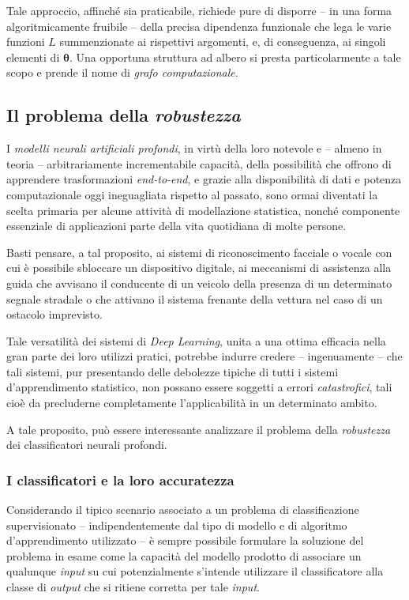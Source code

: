 \documentclass[a4paper, twoside]{article}
\begin{document}
Tale approccio, affinché sia praticabile, richiede pure di disporre -- in una forma algoritmicamente fruibile -- della precisa dipendenza funzionale che lega le varie funzioni $L$ summenzionate ai rispettivi argomenti, e, di conseguenza, ai singoli elementi di $\boldsymbol{\theta}$. Una opportuna struttura ad albero si presta particolarmente a tale scopo e prende il nome di \textit{grafo computazionale}.


\subsection{Il problema della \textit{robustezza}}

I \textit{modelli neurali artificiali profondi}, in virtù della loro notevole e -- almeno in teoria -- arbitrariamente incrementabile capacità, della possibilità che offrono di apprendere trasformazioni \textit{end-to-end}, e grazie alla disponibilità di dati e potenza computazionale oggi ineguagliata rispetto al passato, sono ormai diventati la scelta primaria per alcune attività di modellazione statistica, nonché componente essenziale di applicazioni parte della vita quotidiana di molte persone.

Basti pensare, a tal proposito, ai sistemi di riconoscimento facciale o vocale con cui è possibile sbloccare un dispositivo digitale, ai meccanismi di assistenza alla guida che avvisano il conducente di un veicolo della presenza di un determinato segnale stradale o che attivano il sistema frenante della vettura nel caso di un ostacolo imprevisto.

Tale versatilità dei sistemi di \textit{Deep Learning}, unita a una ottima efficacia nella gran parte dei loro utilizzi pratici, potrebbe indurre credere -- ingenuamente -- che tali sistemi, pur presentando delle debolezze tipiche di tutti i sistemi d'apprendimento statistico, non possano essere soggetti a errori \textit{catastrofici}, tali cioè da precluderne completamente l'applicabilità in un determinato ambito.

A tale proposito, può essere interessante analizzare il problema della \textit{robustezza} dei classificatori neurali profondi.

\subsubsection{I classificatori e la loro accuratezza}

Considerando il tipico scenario associato a un problema di classificazione supervisionato -- indipendentemente dal tipo di modello e di algoritmo d'apprendimento utilizzato -- è sempre possibile formulare la soluzione del problema in esame come la capacità del modello prodotto di associare un qualunque \textit{input} su cui potenzialmente s'intende utilizzare il classificatore alla classe di \textit{output} che si ritiene corretta per tale \textit{input}.
\end{document}
